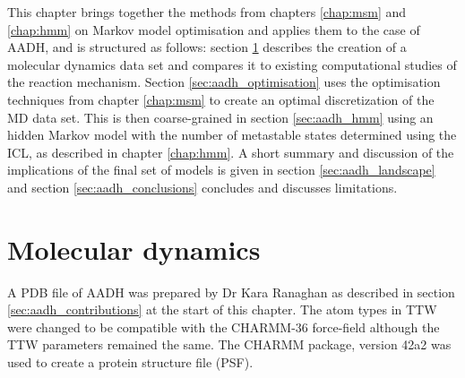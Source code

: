 This chapter brings together the methods from chapters \ref{chap:msm} and \ref{chap:hmm} on Markov model optimisation and applies them to the case of AADH, and is structured as follows: section \ref{sec:aadh_md} describes the creation of a molecular dynamics data set and compares it to existing computational studies of the reaction mechanism. Section \ref{sec:aadh_optimisation} uses the optimisation techniques from chapter \ref{chap:msm} to create an optimal discretization of the MD data set. This is then coarse-grained in section \ref{sec:aadh_hmm} using an hidden Markov model with the number of metastable states determined using the ICL, as described in chapter \ref{chap:hmm}. A short summary and discussion of the implications of the final set of models is given in section \ref{sec:aadh_landscape} and section \ref{sec:aadh_conclusions} concludes and discusses limitations. 

\section{Molecular dynamics}\label{sec:aadh_md}

A PDB file of AADH was prepared by Dr Kara Ranaghan as described in section \ref{sec:aadh_contributions} at the start of this chapter. The atom types in TTW were changed to be compatible with the CHARMM-36 \cite{huangCHARMM36AllatomAdditive2013} force-field although the TTW parameters remained the same. The CHARMM package, version 42a2 \cite{brooksCHARMMBiomolecularSimulation2009} was used to create a protein structure file (PSF). 

